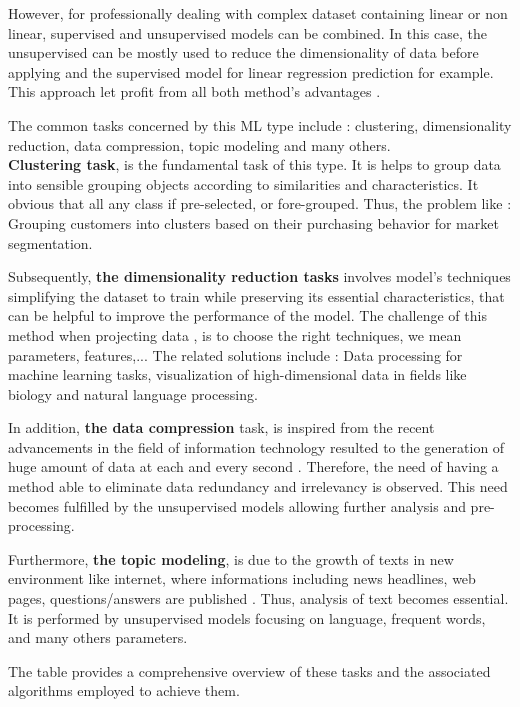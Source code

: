\documentclass[12pt,a4paper]{report}
\begin{document}
However, for professionally dealing with complex dataset containing linear or non linear, supervised and unsupervised models can be combined. In this case, the unsupervised can be mostly used to reduce the dimensionality of data before applying and the supervised model for linear regression prediction for example. This approach let profit from all both method's advantages \cite{liu2000interactive}. 

The common tasks concerned by this ML type include : clustering, dimensionality reduction, data compression, topic modeling and many others. \\

\textbf{Clustering task}, is the fundamental task of this type. It is helps to group data into sensible grouping objects according to similarities and  characteristics. It obvious that all any class if pre-selected, or fore-grouped. Thus, the problem like : Grouping customers into clusters based on their purchasing behavior for market segmentation.

Subsequently, \textbf{the dimensionality reduction tasks} involves  model's techniques simplifying  the dataset to train while preserving its essential characteristics, that can be helpful to improve the performance of the model. The challenge of this method when projecting data \cite{sorzano2014survey}, is to choose the right techniques, we mean parameters, features,...  The related solutions include : Data processing for machine learning tasks, visualization of high-dimensional data in fields like biology and natural language processing. 

In addition, \textbf{the data compression} task, is inspired from the recent advancements in the field of information technology resulted to the generation of huge amount of data at each and every second \cite{jayasankar2021survey} . Therefore, the need of having a method able to eliminate data redundancy and irrelevancy is observed. This need becomes fulfilled by the unsupervised models allowing further analysis and pre-processing.

Furthermore, \textbf{the topic modeling}, is due to the growth of texts in new environment like internet, where informations including news headlines, web pages, questions/answers are published \cite{qiang2020short}. Thus, analysis of text becomes essential. It is performed by unsupervised models focusing on language, frequent words, and many others parameters.

The table provides a comprehensive overview of these tasks and the associated algorithms employed to achieve them.
\end{document}
